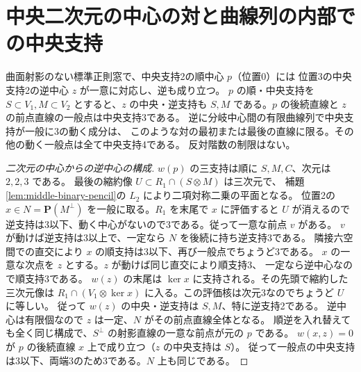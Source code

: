\section{中央二次元の中心の対と曲線列の内部での中央支持}
\label{sec:branch-binary-center-pairing}
\begin{theorem}\label{thm:branch-binary-center-pairing}
曲面射影のない標準正則窓で、中央支持2の順中心 $p$（位置0）には
位置3の中央支持2の逆中心 $z$ が一意に対応し、逆も成り立つ。
$p$ の順・中央支持を $S\subset V_1,M\subset V_2$ とすると、$z$ の中央・逆支持も
$S,M$ である。$p$ の後続直線と $z$ の前点直線の一般点は中央支持3である。
逆に分岐中心間の有限曲線列で中央支持が一般に3の動く成分は、
このような対の最初または最後の直線に限る。その他の動く一般点は全て中央支持4である。
反対階数の制限はない。
\end{theorem}
\begin{proof}[二次元の中心からの逆中心の構成]
$w(p)$ の三支持は順に $S,M,C$、次元は $2,2,3$ である。
最後の縮約像 $U\subset R_1\cap(S\otimes M)$ は三次元で、
補題\ref{lem:middle-binary-pencil}の $L_2$ により二項対称二乗の平面となる。
位置2の $x\in N=\mathbf P(M^\perp)$ を一般に取る。$R_1$ を末尾で $x$ に評価すると
$U$ が消えるので逆支持は3以下、動く中心がないので3である。従って一意な前点 $v$ がある。
$v$ が動けば逆支持は3以上で、一定なら $N$ を後続に持ち逆支持3である。
隣接六空間での直交により $x$ の順支持は3以下、再び一般点でちょうど3である。
$x$ の一意な次点を $z$ とする。$z$ が動けば同じ直交により順支持3、
一定なら逆中心なので順支持3である。
$w(z)$ の末尾は $\ker x$ に支持される。その先頭で縮約した三次元像は
$R_1\cap(V_1\otimes\ker x)$ に入る。この評価核は次元3なのでちょうど $U$ に等しい。
従って $w(z)$ の中央・逆支持は $S,M$、特に逆支持2である。
逆中心は有限個なので $z$ は一定、$N$ がその前点直線全体となる。
順逆を入れ替えても全く同じ構成で、$S^\perp$ の射影直線の一意な前点が元の $p$ である。
$w(x,z)=0$ が $p$ の後続直線 $x$ 上で成り立つ（$z$ の中央支持は $S$）。
従って一般点の中央支持は3以下、両端3のため3である。$N$ 上も同じである。
\end{proof}

